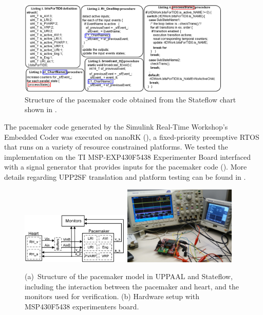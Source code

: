 \begin{figure} [!t]
\center
\includegraphics[width=0.90\textwidth]{figs/CodeListingFinal.png}
\caption{Structure of the pacemaker code obtained from the Stateflow chart shown in .}
\label{fig:pm_code}
\end{figure}


The pacemaker code generated by the Simulink Real-Time Workshop's Embedded Coder was executed on nanoRK (\cite{nanork}), a fixed-priority preemptive RTOS that runs on a variety of resource constrained platforms. We tested the implementation on the TI MSP-EXP430F5438 Experimenter Board interfaced with a signal generator that provides inputs for the pacemaker code (). More details regarding UPP2SF translation and platform testing can be found in \cite{TECS}.

\begin{figure}[!t]
\centering
		\subfigure 
		{			
		\includegraphics[width=0.46\textwidth]{figs/HM_PM_newMon.png}
		\label{fig:hm_pm}
		}
		\subfigure 
		{	
			\includegraphics[width=0.48\textwidth]{figs/HW_setup1.png}
			\label{fig:PM_timer}
		} 
\caption{(a)~Structure of the pacemaker model in UPPAAL and Stateflow, including the interaction between the pacemaker and heart, and the monitors used for verification. (b) Hardware setup with MSP430F5438 experimenters board.}
\label{fig:setup}
\end{figure} 

